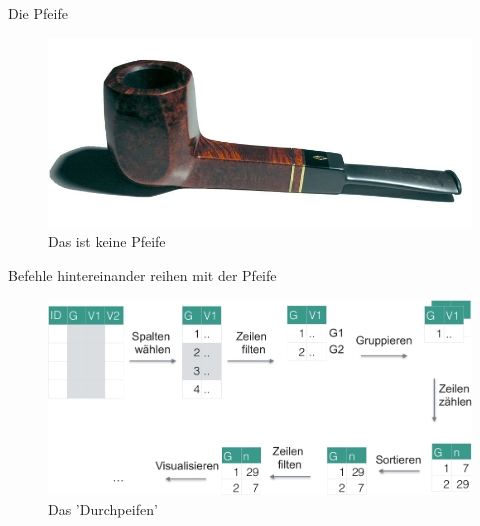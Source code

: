 \begin{frame}{Die Pfeife}

\begin{figure}

{\centering \includegraphics[width=0.8\linewidth]{../images/Datenjudo/800px-Pipa_savinelli} 

}

\caption{Das ist keine Pfeife}\label{fig:cecie-une-pipe}
\end{figure}

\end{frame}

\begin{frame}{Befehle hintereinander reihen mit der Pfeife}

\begin{figure}

{\centering \includegraphics[width=0.8\linewidth]{../images/Datenjudo/durchpfeifen} 

}

\caption{Das 'Durchpeifen'}\label{fig:fig-durchpfeifen}
\end{figure}

\end{frame}

